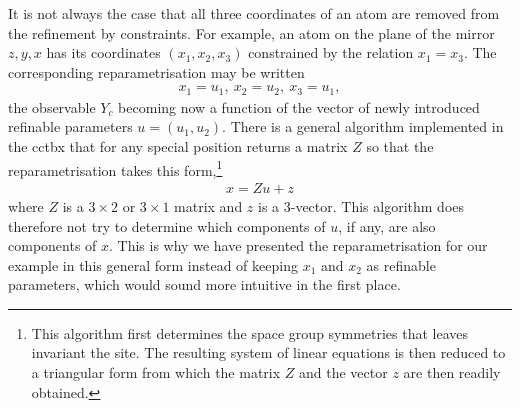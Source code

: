 \documentclass[pdf]{iucr}
\begin{document}
It is not always the case that all three coordinates of an atom are removed from the refinement by constraints. For example, an atom on the plane of the mirror $z,y,x$ has its coordinates $(x_1, x_2, x_3)$ constrained by the relation $x_1 = x_3$. The corresponding reparametrisation may be written
\begin{align}
x_1 = u_1,\ x_2 = u_2,\ x_3 = u_1,
\label{eqn:specialposexamplereparam}
\end{align}
the observable $Y_c$ becoming now a function of the vector of newly introduced refinable parameters $u = (u_1, u_2)$. There is a general algorithm implemented in the cctbx that for any special position returns a matrix $Z$ so that the reparametrisation takes this form,\footnote{This algorithm first determines the space group symmetries that leaves invariant the site. The resulting system of linear equations is then reduced to a triangular form from which the matrix $Z$ and the vector $z$ are then readily obtained.}
\begin{align}
x = Z u + z
\end{align}
where $Z$ is a $3 \times 2$ or $3 \times 1$ matrix and $z$ is a 3-vector. This algorithm does therefore not try to determine which components of $u$, if any, are also components of $x$. This is why we have presented the reparametrisation for our example in this general form instead of keeping $x_1$ and $x_2$ as refinable parameters, which would sound more intuitive in the first place.
\end{document}
